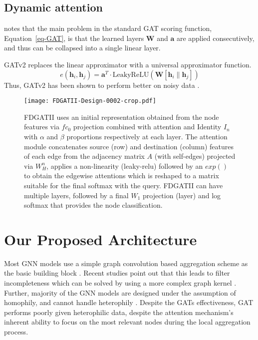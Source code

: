 \documentclass{article}
\begin{document}
\subsection{Dynamic attention}
\citet{brody2021attentive} notes that the main problem in the standard GAT scoring function, Equation~\ref{eq-GAT}, is that the learned layers $\mathbf{W}$ and $\mathbf{a}$ are applied consecutively, and thus can be collapsed into a single linear layer.

GATv2 replaces the linear approximator with a universal approximator function. 
\begin{equation} e\left(\mathbf{h}_{i},\mathbf{h}_{j}\right) =\mathbf{a}^T \cdot \textrm{LeakyReLU}\left(\mathbf{W}\left[\mathbf{h}_{i}\parallel\mathbf{h}_{j}\right]\right) 
\label{eq-GATv2}
\end{equation} 
Thus, GATv2 has been shown to perform better on noisy data \cite{brody2021attentive}.

\begin{figure*}[t]
  \texttt{[image: FDGATII-Design-0002-crop.pdf]}
  \caption{FDGATII uses an initial representation obtained from the node features via $fc_{0}$ projection combined with attention and Identity $I_{n}$ with $\alpha$ and $\beta$ proportions respectively at each layer. The attention module concatenates source (row) and destination (column) features of each edge from the adjacency matrix $A$ (with self-edges) projected via $W_{H}^{n}$, applies a non-linearity (leaky-relu) followed by an $exp()$ to obtain the edgewise attentions which is reshaped to a matrix suitable for the final softmax with the query. FDGATII can have multiple layers, followed by a final $W_{1}$ projection (layer) and log softmax that provides the node classification.}
  \label{fig_FDGATII}
\end{figure*}

\section{Our Proposed Architecture}
Most GNN models use a simple graph convolution based aggregation scheme as the basic building block \cite{kipf2016semi, hamilton2017inductive}. Recent studies point out that this leads to filter incompleteness which can be solved by using a more complex graph kernel \cite{abu2019mixhop}. Further, majority of the GNN models are designed under the assumption of homophily, and cannot handle heterophily \cite{zhu2020beyond}. Despite the GATs effectiveness, GAT performs poorly given heterophilic data, despite the attention mechanism’s inherent ability to focus on the most relevant nodes during the local aggregation process. 
\end{document}
